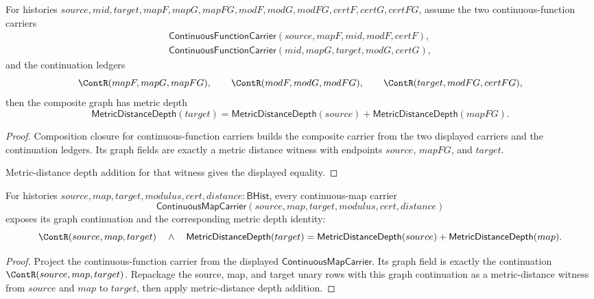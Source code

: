 \begin{theorem}
\label{thm:continuousmap-comp-graph-depth-add}
For histories $source,mid,target,mapF,mapG,mapFG,modF,modG,modFG,certF,certG,certFG$,
assume the two continuous-function carriers
$$
\begin{array}{l}
\mathsf{ContinuousFunctionCarrier}(source,mapF,mid,modF,certF),\\
\mathsf{ContinuousFunctionCarrier}(mid,mapG,target,modG,certG),
\end{array}
$$
and the continuation ledgers
$$
\ContR(mapF,mapG,mapFG),\qquad
\ContR(modF,modG,modFG),\qquad
\ContR(target,modFG,certFG),
$$
then the composite graph has metric depth
$$
\mathsf{MetricDistanceDepth}(target)
=
\mathsf{MetricDistanceDepth}(source)+
\mathsf{MetricDistanceDepth}(mapFG).
$$
\end{theorem}
\begin{proof}
Composition closure for continuous-function carriers builds the composite
carrier from the two displayed carriers and the continuation ledgers. Its graph
fields are exactly a metric distance witness with endpoints $source$, $mapFG$,
and $target$.

Metric-distance depth addition for that witness gives the displayed equality.
\end{proof}

\begin{theorem}
\label{thm:continuousmap-carrier-graph-cont-depth-add}
For histories $source,map,target,modulus,cert,distance:\mathsf{BHist}$, every
continuous-map carrier
$$
\mathsf{ContinuousMapCarrier}(source,map,target,modulus,cert,distance)
$$
exposes its graph continuation and the corresponding metric depth identity:
$$
\ContR(source,map,target)
\quad\land\quad
\mathsf{MetricDistanceDepth}(target)
=
\mathsf{MetricDistanceDepth}(source)+\mathsf{MetricDistanceDepth}(map).
$$
\end{theorem}
\begin{proof}
Project the continuous-function carrier from the displayed
$\mathsf{ContinuousMapCarrier}$. Its graph field is exactly the continuation
$\ContR(source,map,target)$. Repackage the source, map, and target unary rows
with this graph continuation as a metric-distance witness from $source$ and
$map$ to $target$, then apply metric-distance depth addition.
\end{proof}

